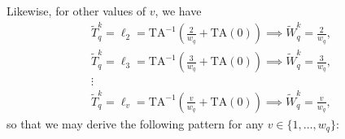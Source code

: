 \documentclass[hidelinks, nonatbib]{elsarticle}
\begin{document}
Likewise, for other values of $v$, we have
\begin{gather}
    \tilde{T}_{q}^{k}
    =
    \ell_2
    =
    \text{TA}^{-1}
    \left(
        \frac{2}{w_q}
        +
        \text{TA}(0)
    \right)
    \implies
    \tilde{W}_{q}^{k}
    =
    \frac{2}{w_q}
    ,
    \\
    \tilde{T}_{q}^{k}
    =
    \ell_3
    =
    \text{TA}^{-1}
    \left(
        \frac{3}{w_q}
        +
        \text{TA}(0)
    \right)
    \implies
    \tilde{W}_{q}^{k}
    =
    \frac{3}{w_q}
    ,
    \\
    \vdots
    \\
    \tilde{T}_{q}^{k}
    =
    \ell_{v}
    =
    \text{TA}^{-1}
    \left(
        \frac{v}{w_q}
        +
        \text{TA}(0)
    \right)
    \implies
    \tilde{W}_{q}^{k}
    =
    \frac{v}{w_q}
    ,
\end{gather}
so that we may derive the following pattern for any $v \in \{1, \dots, w_q\}$:
\end{document}
